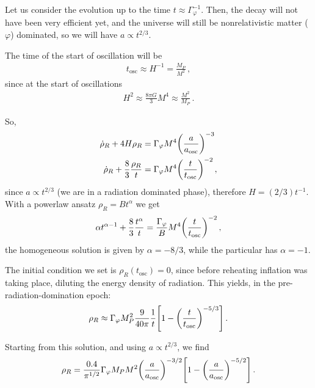 \documentclass[main.tex]{subfiles}
\begin{document}
Let us consider the evolution up to the time \(t \approx \Gamma _\varphi^{-1}\). Then, the decay will not have been very efficient yet, and the universe will still be nonrelativistic matter (\(\varphi \)) dominated, so we will have \(a \propto t^{2/3}\).

The time of the start of oscillation will be 
%
\begin{align}
t _{\text{osc}} \approx H^{-1} = \frac{M_P}{M^2}
\,,
\end{align}
%
since at the start of oscillations
%
\begin{align}
H^2 \approx \frac{8 \pi G}{3} M^{4} \approx \frac{M^2}{M_P}
\,.
\end{align}

So, 
%
\begin{align}
\dot{\rho}_R + 4 H \rho _R &= \Gamma _\varphi M^4  \qty( \frac{a}{a _{\text{osc}}})^{-3} \\
\dot{\rho}_R + \frac{8}{3} \frac{\rho _R}{t} &=
\Gamma _\varphi M^{4} \qty( \frac{t}{t _{\text{osc}}})^{-2} 
\,,
\end{align}
%
since \(a \propto t^{2/3}\) (we are in a radiation dominated phase), therefore \(H = (2/3) t^{-1}\).
With a powerlaw ansatz \(\rho _R = B t^{\alpha }\) we get 
%
\begin{align}
\alpha t^{\alpha -1} + \frac{8}{3} \frac{t^{\alpha }}{t} = \frac{\Gamma _\varphi }{B} M^{4} \qty(\frac{t}{ t _{\text{osc}}})^{-2}
\,,
\end{align}
%
the homogeneous solution is given by \(\alpha = - 8 /3\), while the particular has \(\alpha = -1\). 

The initial condition we set is \(\rho _R (t _{\text{osc}}) = 0\), since before reheating inflation was taking place, diluting the energy density of radiation. 
This yields, in the pre-radiation-domination epoch:
%
\begin{align}
\rho _R \approx \Gamma _\varphi M_P^2 \frac{9}{40 \pi } \frac{1}{t} \qty[ 1 - \qty( \frac{t}{t _{\text{osc}}})^{-5/3}]
\,.
\end{align}



Starting from this solution, and using \(a \propto t^{2/3}\), we find 
%
\begin{align}
\rho _R = \frac{\num{.4}}{\pi^{1/2}} \Gamma _\varphi M_P M^2 \qty(\frac{a}{a _{\text{osc}}})^{-3/2} \qty[1 - \qty(\frac{a}{a _{\text{osc}}})^{- 5/2}]
\,.
\end{align}
\end{document}
